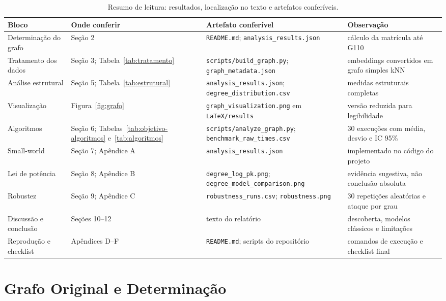 \documentclass[sigconf]{webmedia}
\begin{document}
\begin{table}
  \caption{Resumo de leitura: resultados, localização no texto e artefatos conferíveis.}
  \label{tab:mapa-correcao}
  \small
  \begin{tabular}{@{}p{}p{}p{}p{}@{}}
    \toprule
    Bloco & Onde conferir & Artefato conferível & Observação \\
    \midrule
    Determinação do grafo & Seção 2 & \texttt{README.md}; \texttt{analysis\_results.json} & cálculo da matrícula até G110 \\
    Tratamento dos dados & Seção 3; Tabela~\ref{tab:tratamento} & \texttt{scripts/build\_graph.py}; \texttt{graph\_metadata.json} & embeddings convertidos em grafo simples kNN \\
    Análise estrutural & Seção 5; Tabela~\ref{tab:estrutural} & \texttt{analysis\_results.json}; \texttt{degree\_distribution.csv} & medidas estruturais completas \\
    Visualização & Figura~\ref{fig:grafo} & \texttt{graph\_visualization.png} em \texttt{LaTeX/results} & versão reduzida para legibilidade \\
    Algoritmos & Seção 6; Tabelas~\ref{tab:objetivo-algoritmos} e~\ref{tab:algoritmos} & \texttt{scripts/analyze\_graph.py}; \texttt{benchmark\_raw\_times.csv} & 30 execuções com média, desvio e IC 95\% \\
    Small-world & Seção 7; Apêndice A & \texttt{analysis\_results.json} & implementado no código do projeto \\
    Lei de potência & Seção 8; Apêndice B & \texttt{degree\_log\_pk.png}; \texttt{degree\_model\_comparison.png} & evidência sugestiva, não conclusão absoluta \\
    Robustez & Seção 9; Apêndice C & \texttt{robustness\_runs.csv}; \texttt{robustness.png} & 30 repetições aleatórias e ataque por grau \\
    Discussão e conclusão & Seções 10--12 & texto do relatório & descoberta, modelos clássicos e limitações \\
    Reprodução e checklist & Apêndices D--F & \texttt{README.md}; scripts do repositório & comandos de execução e checklist final \\
    \bottomrule
  \end{tabular}
\end{table}

\section{Grafo Original e Determinação}
\end{document}
